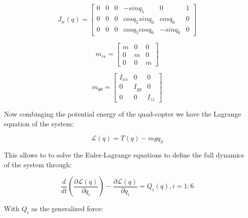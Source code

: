 \documentclass{article}
\begin{document}
\begin{equation}
J_{w}(q)=\left[\begin{array}{cccccc}
0 & 0 & 0 & -sinq_{5} & 0 & 1\\
0 & 0 & 0 & cosq_{5}sinq_{6} & cosq_{6} & 0\\
0 & 0 & 0 & cosq_{5}cosq_{6} & -sinq_{6} & 0
\end{array}\right]
\end{equation}

\begin{equation}
m_{rr}=\left[\begin{array}{ccc}
m & 0 & 0\\
0 & m & 0\\
0 & 0 & m
\end{array}\right]
\end{equation}

\begin{equation}
m_{\theta\theta}=\left[\begin{array}{ccc}
I_{xx} & 0 & 0\\
0 & I_{yy} & 0\\
0 & 0 & I_{zz}
\end{array}\right]
\end{equation}

Now combinging the potential energy of the quad-copter we have the Lagrange equation of the system:

\begin{equation}
\mathcal{L}(q)=T(q)-mgq_{3}
\end{equation}

This allows to to solve the Euler-Lagrange equations to define the full dynamics of the system through:

\begin{equation}
\frac{d}{dt}(\frac{\partial\mathcal{L}(q)}{\partial\dot{q_{i}}})-\frac{\partial\mathcal{L}(q)}{\partial q_{i}}=Q_{i}(q), i=1:6
\end{equation}

With $Q_{i}$ as the generalized force:
\end{document}
